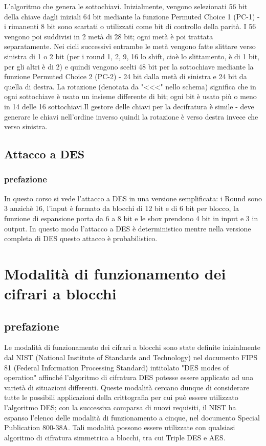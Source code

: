 \documentclass[10pt,a4paper]{article}
\begin{document}
L'algoritmo che genera le sottochiavi. Inizialmente, vengono selezionati 56 bit della chiave dagli iniziali 64 bit mediante la funzione Permuted Choice 1 (PC-1) - i rimanenti 8 bit sono scartati o utilizzati come bit di controllo della parità. I 56 vengono poi suddivisi in 2 metà di 28 bit; ogni metà è poi trattata separatamente. Nei cicli successivi entrambe le metà vengono fatte slittare verso sinistra di 1 o 2 bit (per i round 1, 2, 9, 16 lo shift, cioè lo slittamento, è di 1 bit, per gli altri è di 2) e quindi vengono scelti 48 bit per la sottochiave mediante la funzione Permuted Choice 2 (PC-2) - 24 bit dalla metà di sinistra e 24 bit da quella di destra. La rotazione (denotata da "<<<" nello schema) significa che in ogni sottochiave è usato un insieme differente di bit; ogni bit è usato più o meno in 14 delle 16 sottochiavi.Il gestore delle chiavi per la decifratura è simile - deve generare le chiavi nell'ordine inverso quindi la rotazione è verso destra invece che verso sinistra.

\subsection{Attacco a DES}
\subsubsection{prefazione}
In questo corso si vede l'attacco a DES in una versione semplificata: i Round sono 3 anzichè 16, l'input è formato da blocchi di 12 bit e di 6 bit per blocco, la funzione di espansione porta da 6 a 8 bit e le sbox prendono 4 bit in input e 3 in output. In questo modo l'attacco a DES è deterministico mentre nella versione completa di DES questo attacco è probabilistico.

\section{Modalità di funzionamento dei cifrari a blocchi}
\subsection{prefazione}
Le modalità di funzionamento dei cifrari a blocchi sono state definite inizialmente dal NIST (National Institute of Standards and Technology) nel documento FIPS 81 (Federal Information Processing Standard) intitolato "DES modes of operation" affinché l'algoritmo di cifratura DES potesse essere applicato ad una varietà di situazioni differenti.
Queste modalità cercano dunque di considerare tutte le possibili applicazioni della crittografia per cui può essere utilizzato l'algoritmo DES; con la successiva comparsa di nuovi requisiti, il NIST ha espanso l'elenco delle modalità di funzionamento a cinque, nel documento Special Publication 800-38A.
Tali modalità possono essere utilizzate con qualsiasi algoritmo di cifratura simmetrica a blocchi, tra cui Triple DES e AES.
\end{document}
